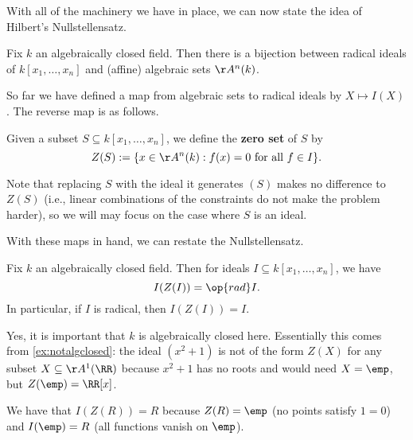 With all of the machinery we have in place, we can now state the idea of Hilbert's Nullstellensatz.
\begin{theorem}[Nullstellensatz, I]
	Fix $k$ an algebraically closed field. Then there is a bijection between radical ideals of $k[x_1,\ldots,x_n]$ and (affine) algebraic sets $\AA^n(k)$.
\end{theorem}
So far we have defined a map from algebraic sets to radical ideals by $X\mapsto I(X)$. The reverse map is as follows.
\begin{definition}[\texorpdfstring{$Z(I)$}{Z(I)}]
	Given a subset $S\subseteq k[x_1,\ldots,x_n]$, we define the \textbf{zero set} of $S$ by
	\[Z(S):=\{x\in\AA^n(k):f(x)=0\text{ for all }f\in I\}.\]
\end{definition}
Note that replacing $S$ with the ideal it generates $(S)$ makes no difference to $Z(S)$ (i.e., linear combinations of the constraints do not make the problem harder), so we will may focus on the case where $S$ is an ideal.

With these maps in hand, we can restate the Nullstellensatz.
\begin{theorem}[Nullstellensatz, II]
	Fix $k$ an algebraically closed field. Then for ideals $I\subseteq k[x_1,\ldots,x_n]$, we have
	\[I(Z(I))=\op{rad}I.\]
	In particular, if $I$ is radical, then $I(Z(I))=I$.
\end{theorem}
\begin{remark}
	Yes, it is important that $k$ is algebraically closed here. Essentially this comes from \autoref{ex:notalgclosed}: the ideal $\left(x^2+1\right)$ is not of the form $Z(X)$ for any subset $X\subseteq\AA^1(\RR)$ because $x^2+1$ has no roots and would need $X=\emp$, but $Z(\emp)=\RR[x]$.
\end{remark}
\begin{example}
	We have that $I(Z(R))=R$ because $Z(R)=\emp$ (no points satisfy $1=0$) and $I(\emp)=R$ (all functions vanish on $\emp$).
\end{example}

